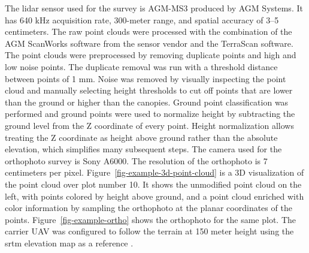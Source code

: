 The \gls{lidar} sensor used for the survey is AGM-MS3 produced by AGM Systems.
It has 640 kHz acquisition rate, 300-meter range, and spatial accuracy of 3–5 centimeters.
The raw point clouds were processed with the combination of the AGM ScanWorks software from the sensor vendor and the TerraScan software.
The point clouds were preprocessed by removing duplicate points and high and low noise points.
The duplicate removal was run with a threshold distance between points of 1 mm.
Noise was removed by visually inspecting the point cloud and manually selecting height thresholds to cut off points that are lower than the ground or higher than the canopies.
Ground point classification was performed and ground points were used to normalize height by subtracting the ground level from the Z coordinate of every point.
Height normalization allows treating the Z coordinate as height above ground rather than the absolute elevation, which simplifies many subsequent steps.
The camera used for the orthophoto survey is Sony A6000.
The resolution of the orthophoto is 7 centimeters per pixel.
Figure~\ref{fig-example-3d-point-cloud} is a 3D visualization of the point cloud over plot number 10.
It shows the unmodified point cloud on the left, with points colored by height above ground, and a point cloud enriched with color information by sampling the orthophoto at the planar coordinates of the points.
Figure~\ref{fig-example-ortho} shows the orthophoto for the same plot.
The carrier UAV was configured to follow the terrain at 150 meter height using the \gls{srtm} elevation map as a reference \citep{farrShuttleRadarTopography2000}.

